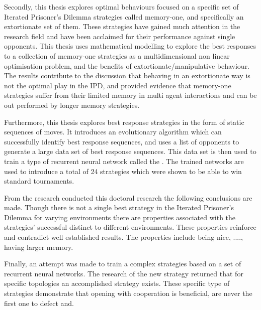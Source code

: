 Secondly, this thesis explores optimal behaviours focused on a specific set of
Iterated Prisoner's Dilemma strategies called memory-one, and specifically an
extortionate set of them. These strategies have gained much attention in the
research field and have been acclaimed for their performance against single
opponents. This thesis uses  mathematical modelling to explore the best
responses to a collection of memory-one strategies as a multidimensional non
linear optimisation problem, and the benefits of extortionate/manipulative
behaviour. The results contribute to the discussion that behaving in an
extortionate way is not the optimal play in the IPD, and provided evidence that
memory-one strategies suffer from their limited memory in multi agent
interactions and can be out performed by longer memory strategies.

Furthermore, this thesis explores best response strategies in the form of static
sequences of moves. It introduces an evolutionary algorithm which can
successfully identify best response sequences, and uses a list of
\numberofstrategiesbestsequences opponents to generate a large data set of best
response sequences. This data set is then used to train a type of recurrent
neural network called the . The trained networks are used to introduce a total
of 24 strategies which were shown to be able to win standard tournaments.

From the research conducted this doctoral research the following conclusions are
made. Though there is not a single best strategy in the Iterated Prisoner's
Dilemma for varying environments there are properties associated with the
strategies' successful distinct to different environments. These properties
reinforce and contradict well established results. The properties include
being nice, ...., having larger memory. 

Finally, an attempt was made to train a complex strategies based on a set of
recurrent neural networks. The research of the new strategy returned that for
specific topologies an accomplished strategy exists. These specific type of
strategies demonstrate that opening with cooperation is beneficial, are
never the first one to defect and.
